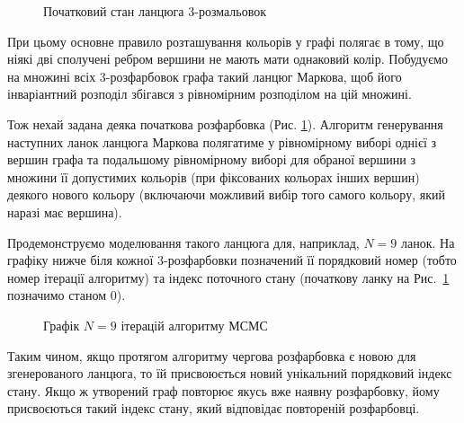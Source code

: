 \documentclass[a4paper,14pt]{extarticle} %
\numberwithin{equation}{section}
\begin{document}
\begin{figure}[H]
    \caption{Початковий стан ланцюга 3-розмальовок}
    \label{figure: task 5.1}
\end{figure}

При цьому основне правило розташування кольорів у графі полягає в тому, що ніякі дві сполучені ребром вершини не мають мати однаковий колір. Побудуємо на множині всіх 3-розфарбовок графа такий ланцюг Маркова, щоб його інваріантний розподіл збігався з рівномірним розподілом на цій множині.

Тож нехай задана деяка початкова розфарбовка (Рис. \ref{figure: task 5.1}). Алгоритм генерування наступних ланок ланцюга Маркова полягатиме у рівномірному виборі однієї з вершин графа та подальшому рівномірному виборі для обраної вершини з множини її допустимих кольорів (при фіксованих кольорах інших вершин) деякого нового кольору (включаючи можливий вибір того самого кольору, який наразі має вершина).

Продемонструємо моделювання такого ланцюга для, наприклад, $N=9$ ланок. На графіку нижче біля кожної 3-розфарбовки позначений її порядковий номер (тобто номер ітерації алгоритму) та індекс поточного стану (початкову ланку на Рис.~\ref{figure: task 5.1} позначимо станом 0).

\begin{figure}[H]
    \caption{Графік $N=9$ ітерацій алгоритму МСМС}
    \label{figure: task 5.2}
\end{figure}

Таким чином, якщо протягом алгоритму чергова розфарбовка є новою для згенерованого ланцюга, то їй присвоюється новий унікальний порядковий індекс стану. Якщо ж утворений граф повторює якусь вже наявну розфарбовку, йому присвоєються такий індекс стану, який відповідає повтореній розфарбовці.
\end{document}
